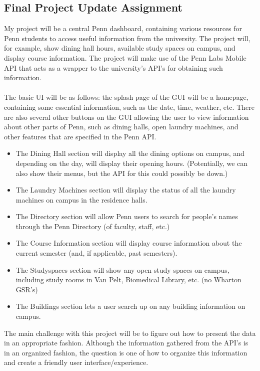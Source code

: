 \documentclass[12pt]{article}
\begin{document}
	\begin{center}
		\section*{Final Project Update Assignment}
	\end{center}
	My project will be a central Penn dashboard, containing various resources for Penn students to access useful information from the university. The project will, for example, show dining hall hours, available study spaces on campus, and display course information. The project will make use of the Penn Labs Mobile API that acts as a wrapper to the university's API's for obtaining such information. \\\\
	The basic UI will be as follows: the splash page of the GUI will be a homepage, containing some essential information, such as the date, time, weather, etc. There are also several other buttons on the GUI allowing the user to view information about other parts of Penn, such as dining halls, open laundry machines, and other features that are specified in the Penn API.
	\begin{itemize}
		\item The Dining Hall section will display all the dining options on campus, and depending on the day, will display their opening hours. (Potentially, we can also show their menus, but the API for this could possibly be down.)
		\item The Laundry Machines section will display the status of all the laundry machines on campus in the residence halls.
		\item The Directory section will allow Penn users to search for people's names through the Penn Directory (of faculty, staff, etc.)
		\item The Course Information section will display course information about the current semester (and, if applicable, past semesters).
		\item The Studyspaces section will show any open study spaces on campus, including study rooms in Van Pelt, Biomedical Library, etc. (no Wharton GSR's)
		\item The Buildings section lets a user search up on any building information on campus.
	\end{itemize}
	The main challenge with this project will be to figure out how to present the data in an appropriate fashion. Although the information gathered from the API's is in an organized fashion, the question is one of how to organize this information and create a friendly user interface/experience.
\end{document}
